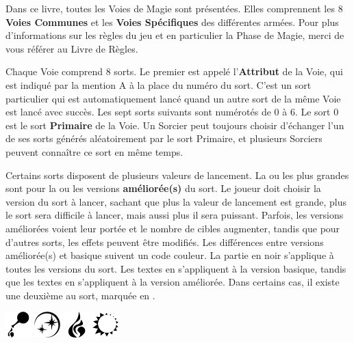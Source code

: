\vspace*{1.5cm}

\spaceaftersection{}

Dans ce livre, toutes les Voies de Magie sont présentées. Elles comprennent les 8 \textbf{Voies Communes} et les \textbf{Voies Spécifiques} des différentes armées. Pour plus d'informations sur les règles du jeu et en particulier la Phase de Magie, merci de vous référer au Livre de Règles.

\vspace*{10pt}
Chaque Voie comprend 8 sorts. Le premier est appelé l’\textbf{Attribut} de la Voie, qui est indiqué par la mention \og A \fg{} à la place du numéro du sort. C'est un sort particulier qui est automatiquement lancé quand un autre sort de la même Voie est lancé avec succès. Les sept sorts suivants sont numérotés de 0 à 6. Le sort 0 est le sort \textbf{Primaire} de la Voie. Un Sorcier peut toujours choisir d'échanger l'un de ses sorts générés aléatoirement par le sort Primaire, et plusieurs Sorciers peuvent connaître ce sort en même temps.

\vspace*{10pt}
Certains sorts disposent de plusieurs valeurs de lancement. La ou les plus grandes sont pour la  ou les versions \textbf{améliorée(s)} du sort. Le joueur doit choisir la version du sort à lancer, sachant que plus la valeur de lancement est grande, plus le sort sera difficile à lancer, mais aussi plus il sera puissant. Parfois, les versions améliorées voient leur portée et le nombre de cibles augmenter, tandis que pour d'autres sorts, les effets peuvent être modifiés. Les différences entre versions améliorée(s) et basique suivent un code couleur. La partie en noir s'applique à toutes les versions du sort. Les textes en  s'appliquent à la version basique, tandis que les textes en  s'appliquent à la version améliorée. Dans certains cas, il existe une deuxième \augment{} au sort, marquée en . 

\vspace*{2.5cm}
\begin{center}
\includegraphics[width=1cm]{pics/alchemy.png}\hspace{0.2cm}%
\includegraphics[width=1cm]{pics/heavens.png}\hspace{0.2cm}%
\includegraphics[width=1cm]{pics/fire.png}\hspace{0.2cm}%
\includegraphics[width=1cm]{pics/light.png}%
\end{center}

